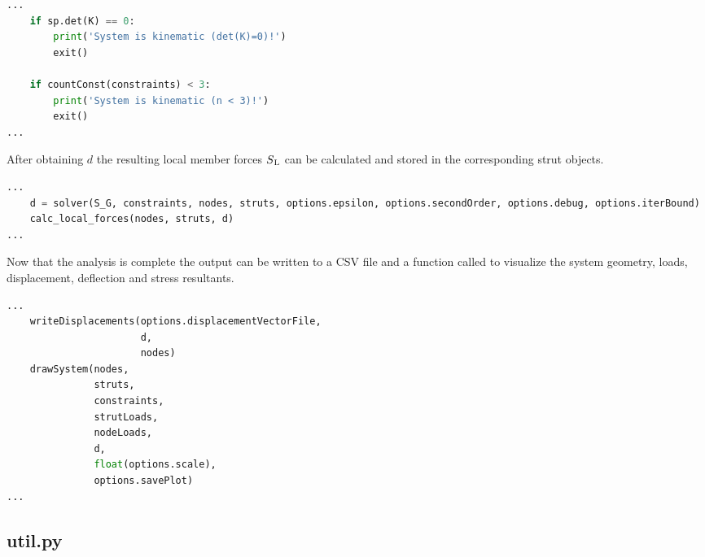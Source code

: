 \begin{inconsolata}
\begin{minipage}{\linewidth}
\begin{lstlisting}[language=python]
...
    if sp.det(K) == 0:
        print('System is kinematic (det(K)=0)!')
        exit()

    if countConst(constraints) < 3:
        print('System is kinematic (n < 3)!')
        exit()
...
\end{lstlisting}
\end{minipage}
\end{inconsolata}

After obtaining $d$ the resulting local member forces $S\textsubscript{L}$ can be calculated and stored in the corresponding strut objects.

\begin{inconsolata}
\begin{minipage}{\linewidth}
\begin{lstlisting}[language=python]
...
    d = solver(S_G, constraints, nodes, struts, options.epsilon, options.secondOrder, options.debug, options.iterBound)
    calc_local_forces(nodes, struts, d)
...
\end{lstlisting}
\end{minipage}
\end{inconsolata}

Now that the analysis is complete the output can be written to a CSV file and a function called to visualize the system geometry, loads, displacement, deflection and stress resultants.

\begin{inconsolata}
\begin{minipage}{\linewidth}
\begin{lstlisting}[language=python]
...
    writeDisplacements(options.displacementVectorFile,
                       d,
                       nodes)
    drawSystem(nodes,
               struts,
               constraints,
               strutLoads,
               nodeLoads,
               d,
               float(options.scale),
               options.savePlot)
...
\end{lstlisting}
\end{minipage}
\end{inconsolata}


\subsection{util.py}
\label{subsec:util.py}

